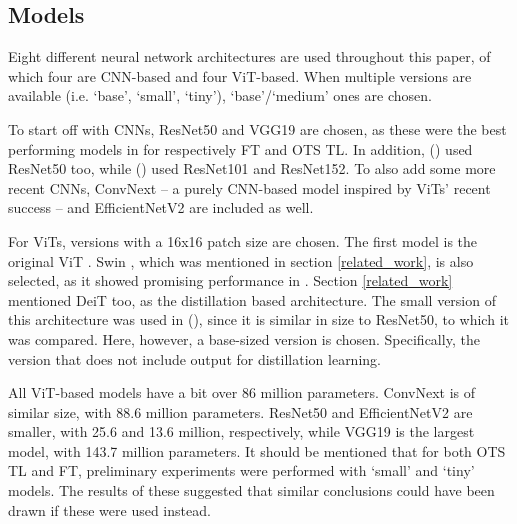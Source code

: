 \subsection{Models} \label{methods:models}
Eight different neural network architectures are used throughout this paper, of which four are CNN-based and four ViT-based. When multiple versions are available (i.e. `base', `small', `tiny'), `base'/`medium' ones are chosen.

To start off with CNNs, ResNet50 \citep{he2016deep} and VGG19 \citep{simonyan2014very} are chosen, as these were the best performing models in \citeauthor{sabatelli2018deep} for respectively FT and OTS TL. In addition, \citeauthor{matsoukas2021time} (\citeyear{matsoukas2021time}) used ResNet50 too, while \citeauthor{zhou2021convnets} (\citeyear{zhou2021convnets}) used ResNet101 and ResNet152. To also add some more recent CNNs, ConvNext \citep{liu2022convnet} -- a purely CNN-based model inspired by ViTs' recent success -- and EfficientNetV2 \citep{tan2021efficientnetv2} are included as well.

For ViTs, versions with a 16x16 patch size are chosen. The first model is the original ViT \citep{dosovitskiy2020image}. Swin \citep{liu2021swin}, which was mentioned in section \ref{related_work}, is also selected, as it showed promising performance in \citeauthor{zhou2021convnets}. Section \ref{related_work} mentioned DeiT \citep{touvron2021training} too, as the distillation based architecture. The small version of this architecture was used in \citeauthor{matsoukas2021time} (\citeyear{matsoukas2021time}), since it is similar in size to ResNet50, to which it was compared. Here, however, a base-sized version is chosen. Specifically, the version that does not include output for distillation learning.

All ViT-based models have a bit over 86 million parameters. ConvNext is of similar size, with 88.6 million parameters. ResNet50 and EfficientNetV2 are smaller, with 25.6 and 13.6 million, respectively, while VGG19 is the largest model, with 143.7 million parameters. It should be mentioned that for both OTS TL and FT, preliminary experiments were performed with `small' and `tiny' models. The results of these suggested that similar conclusions could have been drawn if these were used instead.


